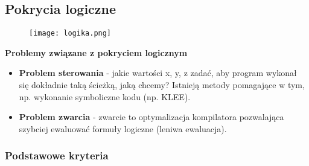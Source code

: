 \documentclass[../main.tex]{subfiles}
\begin{document}
    \subsection{Pokrycia logiczne}

    \begin{figure}[H]
        \texttt{[image: logika.png]}
    \end{figure}

    \textbf{Problemy związane z pokryciem logicznym}
    \begin{itemize}
        \item \textbf{Problem sterowania} - jakie wartości x, y, z zadać, aby program wykonał się dokładnie taką ścieżką,
        jaką chcemy? Istnieją metody pomagające w tym, np. wykonanie symboliczne kodu (np. KLEE).


        \item \textbf{Problem zwarcia} - zwarcie to optymalizacja kompilatora pozwalająca szybciej ewaluować
        formuły logiczne (leniwa ewaluacja).
    \end{itemize}

    \subsubsection{Podstawowe kryteria}
\end{document}

